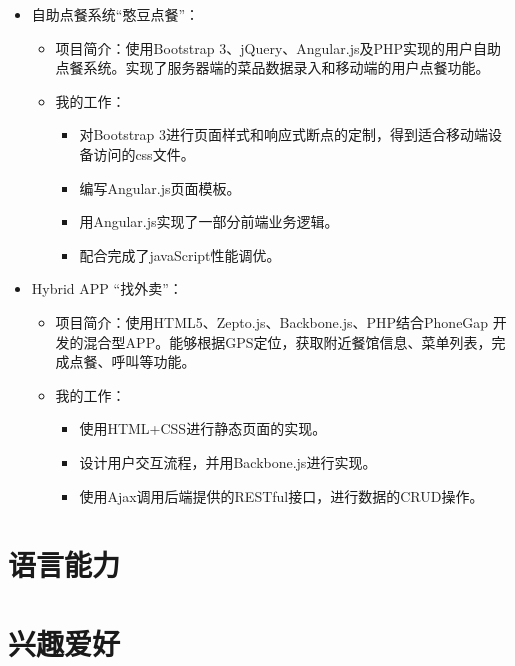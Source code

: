 \documentclass[11pt,a4paper,sans]{moderncv}        %
\begin{document}
{\begin{itemize}
\begin{itemize}
\begin{itemize}
      \end{itemize}
  \end{itemize}
\item 自助点餐系统“憨豆点餐”：
  \begin{itemize}%
  \item 项目简介：使用Bootstrap 3、jQuery、Angular.js及PHP实现的用户自助点餐系统。实现了服务器端的菜品数据录入和移动端的用户点餐功能。
  \item 我的工作：
      \begin{itemize}%
        \item 对Bootstrap 3进行页面样式和响应式断点的定制，得到适合移动端设备访问的css文件。
        \item 编写Angular.js页面模板。
        \item 用Angular.js实现了一部分前端业务逻辑。
        \item 配合完成了javaScript性能调优。
      \end{itemize}
  \end{itemize}
\item Hybrid APP “找外卖”：
  \begin{itemize}%
  \item 项目简介：使用HTML5、Zepto.js、Backbone.js、PHP结合PhoneGap 开发的混合型APP。能够根据GPS定位，获取附近餐馆信息、菜单列表，完成点餐、呼叫等功能。
  \item 我的工作：
      \begin{itemize}%
        \item 使用HTML+CSS进行静态页面的实现。
        \item 设计用户交互流程，并用Backbone.js进行实现。
        \item 使用Ajax调用后端提供的RESTful接口，进行数据的CRUD操作。
      \end{itemize}
  \end{itemize}
\end{itemize}}

\section{语言能力}



\section{兴趣爱好}
\end{document}
